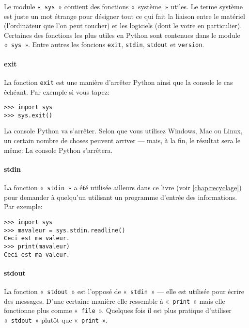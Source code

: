 Le module «~\verb+sys+~» contient des fonctions «~système~» utiles. Le terme système est juste un mot étrange pour désigner tout ce qui fait la liaison entre le matériel (l'ordinateur que l'on peut toucher) et les logiciels (dont le votre en particulier). Certaines des fonctions les plus utiles en Python sont contenues dans le module «~\texttt{sys}~». Entre autres les foncions \verb+exit+, \verb+stdin+, \verb+stdout+ et \verb+version+.
\paragraph{exit}

La fonction \verb+exit+ est une manière d'arrêter Python ainsi que la console le cas échéant. Par exemple si vous tapez:

\begin{Verbatim}[frame=single,rulecolor=\color{gray}]
>>> import sys
>>> sys.exit()
\end{Verbatim}

La console Python va s'arrêter. Selon que vous utilisez Windows, Mac ou Linux, un certain nombre de choses peuvent arriver --- mais, à la fin, le résultat sera le même: La console Python s'arrêtera.
\paragraph{stdin}

La fonction «~\verb+stdin+~» a été utilisée ailleurs dans ce livre (voir \autoref{chap:recyclage}) pour demander à quelqu'un utilisant un programme d'entrée des informations. Par exemple:

\begin{Verbatim}[frame=single,rulecolor=\color{gray}]
>>> import sys
>>> mavaleur = sys.stdin.readline()
Ceci est ma valeur.
>>> print(mavaleur)
Ceci est ma valeur.
\end{Verbatim}
\paragraph{stdout}

La fonction «~\verb+stdout+~» est l'opposé de «~\texttt{stdin}~» --- elle est utilisée pour écrire des messages. D'une certaine manière elle ressemble à «~\texttt{print}~» mais elle fonctionne plus comme «~\texttt{file}~». Quelques fois il est plus pratique d'utiliser «~\texttt{stdout}~» plutôt que «~\texttt{print}~».

